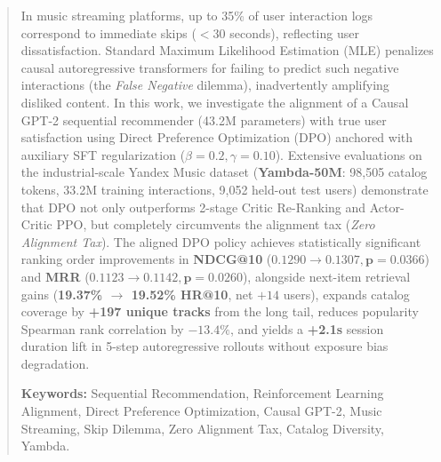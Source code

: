 \begin{abstract}
\noindent In music streaming platforms, up to 35\% of user interaction logs correspond to immediate skips ($<30$ seconds), reflecting user dissatisfaction. Standard Maximum Likelihood Estimation (MLE) penalizes causal autoregressive transformers for failing to predict such negative interactions (the \textit{False Negative} dilemma), inadvertently amplifying disliked content. In this work, we investigate the alignment of a Causal GPT-2 sequential recommender (43.2M parameters) with true user satisfaction using Direct Preference Optimization (DPO) anchored with auxiliary SFT regularization ($\beta=0.2, \gamma=0.10$). Extensive evaluations on the industrial-scale Yandex Music dataset (\textbf{Yambda-50M}: 98,505 catalog tokens, 33.2M training interactions, 9,052 held-out test users) demonstrate that DPO not only outperforms 2-stage Critic Re-Ranking and Actor-Critic PPO, but completely circumvents the alignment tax (\textit{Zero Alignment Tax}). The aligned DPO policy achieves statistically significant ranking order improvements in \textbf{NDCG@10} ($0.1290 \to 0.1307, \mathbf{p = 0.0366}$) and \textbf{MRR} ($0.1123 \to 0.1142, \mathbf{p = 0.0260}$), alongside next-item retrieval gains (\textbf{19.37\% $\to$ 19.52\% HR@10}, net $+14$ users), expands catalog coverage by \textbf{+197 unique tracks} from the long tail, reduces popularity Spearman rank correlation by \textbf{$-13.4\%$}, and yields a \textbf{+2.1s} session duration lift in 5-step autoregressive rollouts without exposure bias degradation.

\vspace{0.5em}
\noindent\textbf{Keywords:} Sequential Recommendation, Reinforcement Learning Alignment, Direct Preference Optimization, Causal GPT-2, Music Streaming, Skip Dilemma, Zero Alignment Tax, Catalog Diversity, Yambda.
\end{abstract}
